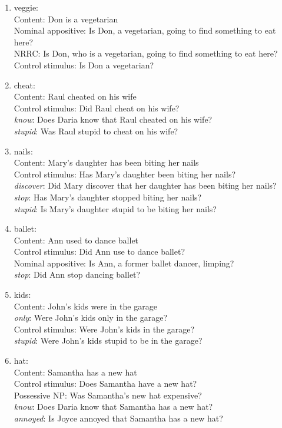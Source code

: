 \documentclass[11pt,fleqn]{article}
\newcommand{\6}{\mbox{$[\hspace*{-.6mm}[$}}
\newcommand{\9}{\mbox{$]\hspace*{-.6mm}]$}}
\begin{document}
\begin{itemize}
\begin{enumerate}
\item veggie:  \\
     Content: Don is a vegetarian\\
     Nominal appositive: Is Don, a vegetarian, going to find something to eat here?\\
     NRRC: Is Don, who is a vegetarian, going to find something to eat here?\\
     Control stimulus: Is Don a vegetarian?

\item cheat:  \\
     Content: Raul cheated on his wife\\
     Control stimulus: Did Raul cheat on his wife?\\
     {\em know}: Does Daria know that Raul cheated on his wife?\\
     {\em stupid}: Was Raul stupid to cheat on his wife?

\item nails:  \\
     Content: Mary's daughter has been biting her nails\\
     Control stimulus: Has Mary's daughter been biting her nails?\\
     {\em discover}: Did Mary discover that her daughter has been biting her nails?\\
     {\em stop}: Has Mary's daughter stopped biting her nails?\\
     {\em stupid}: Is Mary's daughter stupid to be biting her nails?

\item  ballet:  \\
     Content: Ann used to dance ballet\\
     Control stimulus: Did Ann use to dance ballet?\\
     Nominal appositive: Is Ann, a former ballet dancer, limping?\\
     {\em stop}: Did Ann stop dancing ballet?

\item kids:  \\
     Content: John's kids were in the garage\\
     {\em only}: Were John's kids only in the garage?\\
     Control stimulus: Were John's kids in the garage?\\
     {\em stupid}: Were John's kids stupid to be in the garage?

\item hat:  \\
     Content: Samantha has a new hat\\
     Control stimulus: Does Samantha have a new hat?\\
     Possessive NP: Was Samantha's new hat expensive?\\
     {\em know}: Does Daria know that Samantha has a new hat?\\
     {\em annoyed}: Is Joyce annoyed that Samantha has a new hat?


\end{enumerate}
\end{itemize}
\end{document}
